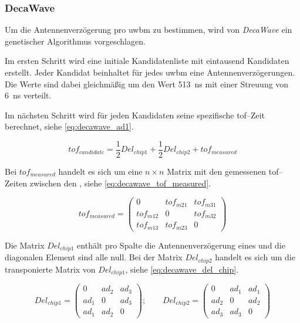 \begin{comment}
--------------------------------------------------------------------------------
\end{comment}
\subsubsection{DecaWave}

Um die Antennenverzögerung pro \Gls{uwbm} zu bestimmen, wird von \textit{DecaWave} ein genetischer Algorithmus vorgeschlagen. \cite{decawave2014calibration}

Im ersten Schritt wird eine initiale Kandidatenliste mit eintausend Kandidaten erstellt. Jeder Kandidat beinhaltet für jedes \Gls{uwbm} eine Antennenverzögerungen. Die Werte sind dabei gleichmäßig um den Wert \SI{513}{\ns} mit einer Streuung von \SI{6}{\ns} verteilt.

Im nächsten Schritt wird für jeden Kandidaten seine spezifische \Gls{tof}--Zeit berechnet, siehe \autoref{eq:decawave_ad1}.

\begin{equation}
tof_{candidate}=\frac12 Del_{chip1} + \frac12 Del_{chip2} + tof_{measured}\label{eq:decawave_ad1}
\end{equation}

Bei $tof_{measured}$ handelt es sich um eine $n \times n$ Matrix mit den gemessenen \Gls{tof}--Zeiten zwischen den , siehe \autoref{eq:decawave_tof_measured}.

\begin{equation}
tof_{measured} = \begin{pmatrix}0 & tof_{m21} & tof_{m31} \\ tof_{m12} & 0 & tof_{m32} \\ tof_{m13} & tof_{m23} & 0 \end{pmatrix} \label{eq:decawave_tof_measured}
\end{equation}

Die Matrix $Del_{chip1}$ enthält pro Spalte die Antennenverzögerung eines  und die diagonalen Element sind alle null. Bei der Matrix $Del_{chip2}$ handelt es sich um die transponierte Matrix von $Del_{chip1}$, siehe \autoref{eq:decawave_del_chip}.

\begin{equation}
Del_{chip1} = \begin{pmatrix}0 & ad_2 & ad_3 \\ ad_1 & 0 & ad_3 \\ ad_1 & ad_2 & 0 \end{pmatrix}; \qquad Del_{chip2} = \begin{pmatrix}0 & ad_1 & ad_1 \\ ad_2 & 0 & ad_2 \\ ad_3 & ad_3 & 0 \end{pmatrix} \label{eq:decawave_del_chip}
\end{equation}

